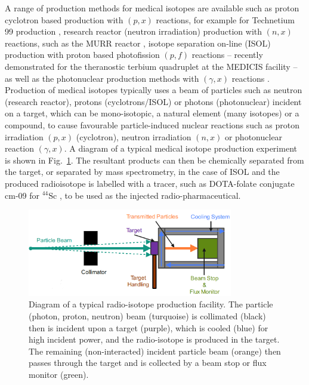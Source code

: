 \documentclass[../main.tex]{subfiles}
\begin{document}
A range of production methods for medical isotopes are available such as proton cyclotron based production  with $\left(p,x\right)$ reactions, for example for Technetium 99 production \cite{gagnon2011cyclotron}, research reactor (neutron irradiation) production with $\left(n,x\right)$ reactions, such as the MURR reactor \cite{ma1996production}, isotope separation on-line (ISOL) production with  proton based photofission $\left(p,f\right)$ reactions -- recently demonstrated for the theranostic terbium quadruplet \cite{muller2012unique} at the MEDICIS facility \cite{dos2014cern} -- as well as the photonuclear production methods with $\left(\gamma,x\right)$ reactions \cite{habs2011production}. Production of medical isotopes typically uses a beam of particles such as neutron (research reactor), protons (cyclotrons/ISOL) or photons (photonuclear) incident on a target, which can be mono-isotopic, a natural element (many isotopes) or a compound, to cause favourable particle-induced nuclear reactions such as proton irradiation $\left(p,x\right)$ (cyclotron), neutron irradiation $\left(n,x\right)$ or photonuclear reaction $\left(\gamma,x\right)$. A diagram of a typical medical isotope production experiment is shown in Fig.~\ref{fig:isotope_production_diagram}. The resultant products can then be chemically separated from the target, or separated by mass spectrometry, in the case of ISOL \cite{catherall2017isolde} and the produced radioisotope is labelled with a tracer, such as DOTA-folate conjugate cm-09 for $^{44}\mathrm{Sc}$ \cite{muller2013folate}, to be used as the injected radio-pharmaceutical.  
\begin{figure}[!h]
\centering
\includegraphics[width=0.8\textwidth]{Figures/DIANA_Inverse_Compton_Source_Design/Isotope_Production_diagram_fixed.png}
\caption{Diagram of a typical radio-isotope production facility. The particle (photon, proton, neutron) beam (turquoise) is collimated (black) then is incident upon a target (purple), which is cooled (blue) for high incident power, and the radio-isotope is produced in the target. The remaining (non-interacted) incident particle beam (orange) then passes through the target and is collected by a beam stop or flux monitor (green).}
\label{fig:isotope_production_diagram}
\end{figure}
\end{document}

